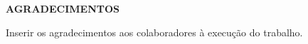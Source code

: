 \chapter*{}
\vspace{-4cm}
\begin{center}
 \textbf{AGRADECIMENTOS}
\end{center}

\vspace{0.5cm}

Inserir os agradecimentos aos colaboradores à execução do trabalho.

